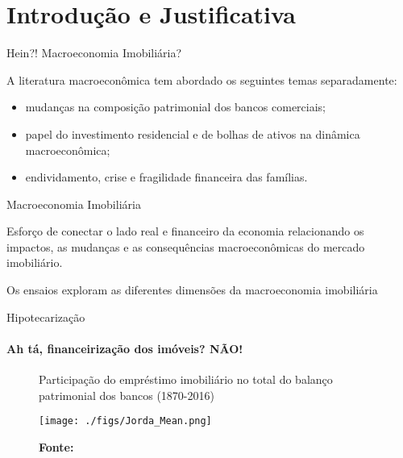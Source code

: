 \section[Introdução]{Introdução e Justificativa}

\begin{frame}{Hein?! Macroeconomia Imobiliária?}

A literatura macroeconômica tem abordado os seguintes temas separadamente:

\begin{itemize}
    \item mudanças na composição patrimonial dos bancos comerciais;
    \item papel do investimento residencial e de bolhas de ativos na dinâmica macroeconômica;
    \item endividamento, crise e fragilidade financeira das famílias.
\end{itemize}

\begin{alert}{Macroeconomia Imobiliária}

Esforço de conectar o lado real e financeiro da economia relacionando os impactos, as mudanças e as consequências macroeconômicas do mercado imobiliário.

Os ensaios exploram as diferentes dimensões da macroeconomia imobiliária
\end{alert}

\end{frame}

\begin{frame}{Hipotecarização}
\framesubtitle{Ah tá, financeirização dos imóveis? NÃO!}

\begin{figure}[H]
	\centering
	\caption{Participação do empréstimo imobiliário no total do balanço patrimonial dos bancos (1870-2016)}
	\label{GraficoJorda}
	\texttt{[image: ./figs/Jorda\_Mean.png]}
	\caption*{\textbf{Fonte:} \textcite{jorda_rate_2019}}
\end{figure}
    
\end{frame}